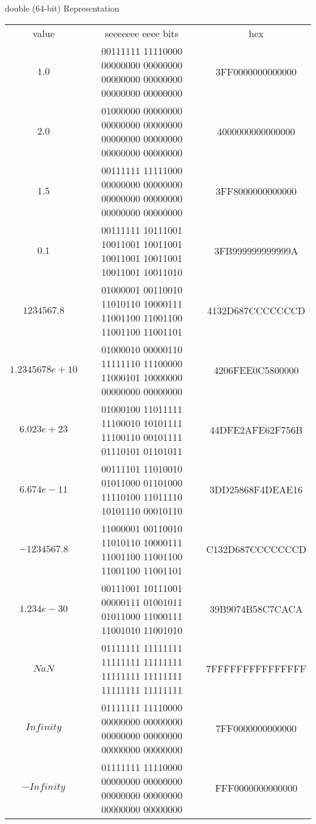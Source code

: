 \begin{withoutheadline}
\begin{frame}[fragile]{double (64-bit) Representation}
\begin{tabular}{c|c|c}
value           & seeeeeee eeee                                                      bits &              hex \\
$1.0$           & 00111111 11110000 00000000 00000000 00000000 00000000 00000000 00000000 & 3FF0000000000000 \\
$2.0$           & 01000000 00000000 00000000 00000000 00000000 00000000 00000000 00000000 & 4000000000000000 \\
$1.5$           & 00111111 11111000 00000000 00000000 00000000 00000000 00000000 00000000 & 3FF8000000000000 \\
$0.1$           & 00111111 10111001 10011001 10011001 10011001 10011001 10011001 10011010 & 3FB999999999999A \\
$1234567.8$     & 01000001 00110010 11010110 10000111 11001100 11001100 11001100 11001101 & 4132D687CCCCCCCD \\
$1.2345678e+10$ & 01000010 00000110 11111110 11100000 11000101 10000000 00000000 00000000 & 4206FEE0C5800000 \\
$6.023e+23$     & 01000100 11011111 11100010 10101111 11100110 00101111 01110101 01101011 & 44DFE2AFE62F756B \\
$6.674e-11$     & 00111101 11010010 01011000 01101000 11110100 11011110 10101110 00010110 & 3DD25868F4DEAE16 \\
$-1234567.8$    & 11000001 00110010 11010110 10000111 11001100 11001100 11001100 11001101 & C132D687CCCCCCCD \\
$1.234e-30$     & 00111001 10111001 00000111 01001011 01011000 11000111 11001010 11001010 & 39B9074B58C7CACA \\    
$NaN$           & 01111111 11111111 11111111 11111111 11111111 11111111 11111111 11111111 & 7FFFFFFFFFFFFFFF \\
$Infinity$      & 01111111 11110000 00000000 00000000 00000000 00000000 00000000 00000000 & 7FF0000000000000 \\
$-Infinity$     & 01111111 11110000 00000000 00000000 00000000 00000000 00000000 00000000 & FFF0000000000000 \\
\end{tabular}
\end{frame}
    

\end{withoutheadline}
